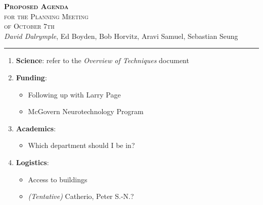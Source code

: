 \documentclass[letter,12pt]{article}
\begin{document}
\begin{center}
  \textsc{\Large \textbf{Proposed Agenda} \\[0.5mm] for the Planning Meeting \\[2.8mm] of October 7th}\\[2.6mm]
	\textit{David Dalrymple}, Ed Boyden, Bob Horvitz, Aravi Samuel, Sebastian Seung\\[1.7mm]
	\rule[2mm]{0.76\textwidth}{0.25mm}
\end{center}
\vspace{0.64cm}
\begin{enumerate}
\item \textbf{Science}: refer to the \textit{Overview of Techniques} document
\item \textbf{Funding}: 
	\begin{itemize}
		\item Following up with Larry Page
		\item McGovern Neurotechnology Program
	\end{itemize}
\item \textbf{Academics}:
	\begin{itemize}
		\item Which department should I be in?
	\end{itemize}
\item \textbf{Logistics}:
	\begin{itemize} 
		\item Access to buildings
		\item \textit{(Tentative)} Catherio, Peter S.-N.?
	\end{itemize}
\end{enumerate}
\end{document}
